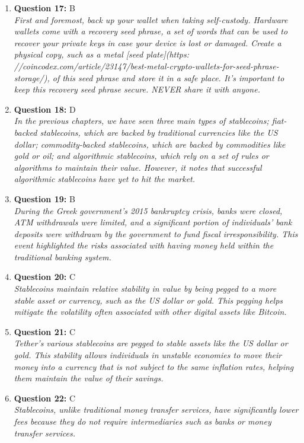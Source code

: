 \documentclass[12pt,a4paper]{article}
\begin{document}
\begin{enumerate}
\item \textbf{Question 17:} B
\\ \textit{First and foremost, back up your wallet when taking self-custody.
Hardware wallets come with a recovery seed phrase, a set of words that 
can be used to recover your private keys in case your device is lost or damaged.
Create a physical copy, such as a metal [seed plate](https: //coincodex.com/article/23147/best-metal-crypto-wallets-for-seed-phrase-storage/), of this seed phrase and 
store it in a safe place. It's important to keep this recovery seed phrase secure. 
NEVER share it with anyone.}

\item \textbf{Question 18:} D
\\ \textit{In the previous chapters, we have seen three main types of stablecoins; 
fiat-backed stablecoins, which are backed by traditional currencies 
like the US dollar; commodity-backed stablecoins, which are backed by 
commodities like gold or oil; and algorithmic stablecoins, which rely 
on a set of rules or algorithms to maintain their value. However, 
it notes that successful algorithmic stablecoins have yet to hit the market.}

\item \textbf{Question 19:} B
\\ \textit{During the Greek government's 2015 bankruptcy crisis, banks were closed, 
ATM withdrawals were limited, and a significant portion of individuals' 
bank deposits were withdrawn by the government to fund fiscal irresponsibility.
This event highlighted the risks associated with having money held within the traditional banking system.}

\item \textbf{Question 20:} C
\\ \textit{Stablecoins maintain relative stability in value by being pegged 
to a more stable asset or currency, such as the US dollar or gold.
This pegging helps mitigate the volatility often associated with other 
digital assets like Bitcoin.}

\item \textbf{Question 21:} C
\\ \textit{Tether’s various stablecoins are pegged to stable assets like the US 
dollar or gold. This stability allows individuals in unstable economies 
to move their money into a currency that is not subject to the same 
inflation rates, helping them maintain the value of their savings.}

\item \textbf{Question 22:} C
\\ \textit{Stablecoins, unlike traditional money transfer services, have significantly 
lower fees because they do not require intermediaries such as banks or money 
transfer services.}


\end{enumerate}
\end{document}
